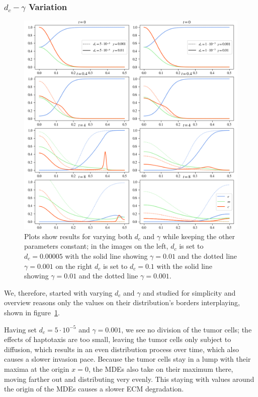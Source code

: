 \subsubsection*{$d_c - \gamma$ Variation}
\begin{figure}[h!]
 \centering
 \includegraphics[width=\textwidth]{resources/images/dc_gamma_variation.png}
 \caption{Plots show results for varying both $d_c$ and $\gamma$ while keeping the other parameters constant; in the images on the left, $d_c$ is set to $d_c=0.00005$ with the solid line showing $\gamma = 0.01$ and the dotted line $\gamma=0.001$ on the right $d_c$ is set to $d_c=0.1$ with the solid line showing $\gamma = 0.01$ and the dotted line $\gamma=0.001$.}
 \label{fig:dc_gamma_variation}
\end{figure}
We, therefore, started with varying $d_c$ and $\gamma$ and studied for simplicity and overview reasons only the values on their distribution's borders interplaying, shown in figure~\ref{fig:dc_gamma_variation}.

Having set $d_c=5\cdot 10^{-5}$ and $\gamma=0.001$, we see no division of the tumor cells; the effects of haptotaxis are too small, leaving the tumor cells only subject to diffusion, which results in an even distribution process over time, which also causes a slower invasion pace. Because the tumor cells stay in a lump with their maxima at the origin $x=0$, the MDEs also take on their maximum there, moving farther out and distributing very evenly. This staying with values around the origin of the MDEs causes a slower ECM degradation. 

